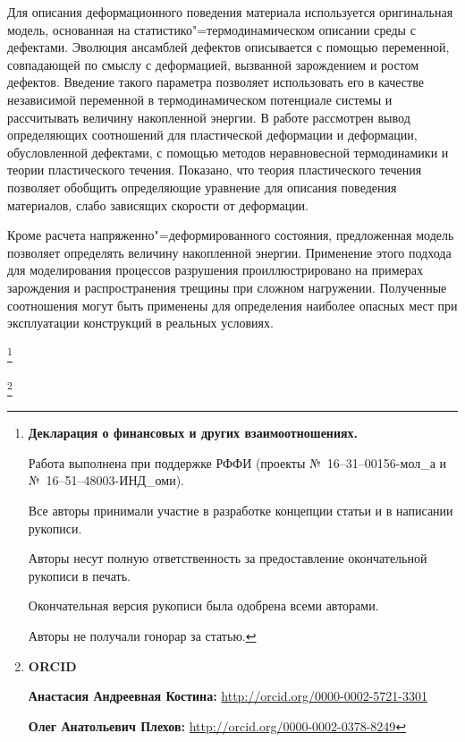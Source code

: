 Для описания деформационного поведения материала используется оригинальная модель, основанная на статистико"=термодинамическом описании среды с дефектами. Эволюция ансамблей дефектов описывается с помощью переменной, совпадающей по смыслу с деформацией, вызванной зарождением и ростом дефектов. Введение такого параметра позволяет использовать его в качестве независимой переменной в термодинамическом потенциале системы и рассчитывать величину накопленной энергии. В работе рассмотрен вывод определяющих соотношений для пластической деформации и деформации, обусловленной дефектами, с помощью методов неравновесной термодинамики и теории пластического течения. Показано, что теория пластического течения позволяет обобщить определяющие уравнение для описания поведения материалов, слабо зависящих скорости от деформации.



Кроме расчета напряженно"=деформированного состояния, предложенная модель позволяет определять величину накопленной энергии. Применение этого подхода для моделирования процессов разрушения проиллюстрировано на примерах зарождения и распространения трещины при сложном нагружении. Полученные соотношения могут быть применены для определения наиболее опасных мест при эксплуатации конструкций в реальных условиях.









\thanks{{\bf Декларация о финансовых и других взаимоотношениях.}

Работа выполнена при поддержке РФФИ (проекты №~16--31--00156-мол\_а и №~16--51--48003-ИНД\_оми).

Все  авторы  принимали  участие  в  разработке  концепции  \mbox{статьи}  и  в  написании  рукописи. 

Авторы несут  полную  ответственность  за  предоставление  окончательной рукописи в печать.

Окончательная  версия рукописи была одобрена всеми авторами.

Авторы не получали гонорар за статью.

}



\newpage



\thanks{{\bf ORCID}



{\bf Анастасия Андреевная Костина:}  \url{http://orcid.org/0000-0002-5721-3301}



{\bf Олег Анатольевич Плехов:}  \url{http://orcid.org/0000-0002-0378-8249}



}








